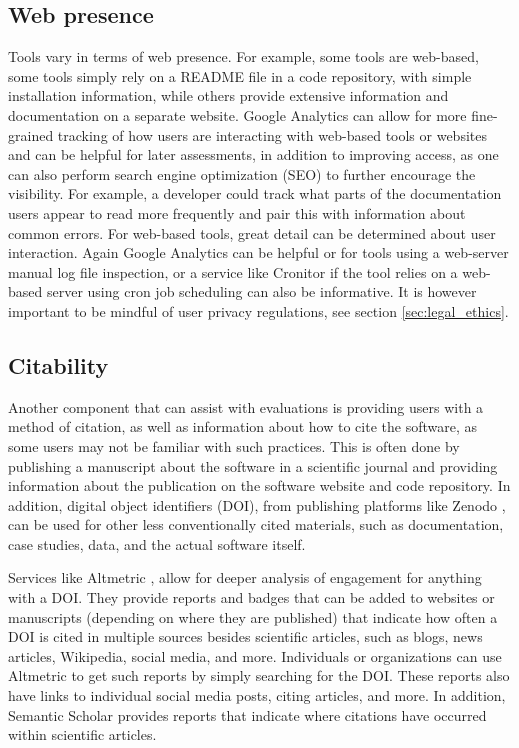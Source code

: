 \documentclass{article}
\begin{document}
\subsection{Web presence}
Tools vary in terms of web presence. For example, some tools are web-based, some tools simply rely on a README file in a code repository, with simple installation information, while others provide extensive information and documentation on a separate website. Google Analytics can allow for more fine-grained tracking of how users are interacting with web-based tools or websites and can be helpful for later assessments, in addition to improving access, as one can also perform search engine optimization (SEO) to further encourage the visibility. For example, a developer could track what parts of the documentation users appear to read more frequently and pair this with information about common errors. For web-based tools, great detail can be determined about user interaction. Again Google Analytics can be helpful or for tools using a web-server manual log file inspection, or a service like Cronitor \cite{cronitor}  if the tool relies on a web-based server using cron \cite{cron_2009} job scheduling can also be informative.  It is however important to be mindful of user privacy regulations, see section \ref{sec:legal_ethics}.

\subsection{Citability}
Another component that can assist with evaluations is providing users with a method of citation, as well as information about how to cite the software, as some users may not be familiar with such practices. This is often done by publishing a manuscript about the software in a scientific journal and providing information about the publication on the software website and code repository. In addition, digital object identifiers (DOI), from publishing platforms like Zenodo \cite{zenodo}, can be used for other less conventionally cited materials, such as documentation, case studies, data, and the actual software itself.

Services like Altmetric \cite{noauthor_altmetric_2015}, allow for deeper analysis of engagement for anything with a DOI. They provide reports and badges that can be added to websites or manuscripts (depending on where they are published) that indicate how often a DOI is cited in multiple sources besides scientific articles, such as blogs, news articles, Wikipedia, social media, and more.  Individuals or organizations can use Altmetric to get such reports by simply searching for the DOI. These reports also have links to individual social media posts, citing articles, and more. In addition, Semantic Scholar  \cite{noauthor_semantic_nodate} provides reports that indicate where citations have occurred within scientific articles. 
\end{document}
